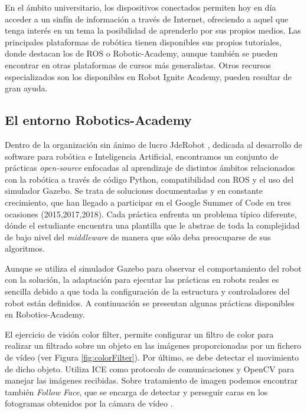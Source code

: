 \documentclass[12pt,spanish,chapterprefix, numbers=noenddot]{book}
\numberwithin{equation}{section}
\numberwithin{figure}{section}
\begin{document}
En el ámbito universitario, los dispositivos conectados permiten hoy en día acceder a un sinfín de información a través de Internet, ofreciendo a aquel que tenga interés en un tema la posibilidad de aprenderlo por sus propios medios. 
Las principales plataformas de robótica tienen disponibles sus propios tutoriales, donde destacan los de ROS o Robotic-Academy, aunque también se pueden encontrar en otras plataformas de cursos más generalistas. Otros recursos especializados son los disponibles en Robot Ignite Academy, pueden resultar de gran ayuda. 

\subsection{El entorno Robotics-Academy}
Dentro de la organización sin ánimo de lucro JdeRobot \cite{jderobot}, dedicada al desarrollo de software para robótica e Inteligencia Artificial, encontramos un conjunto de prácticas \textit{open-source} enfocadas al aprendizaje de distintos ámbitos relacionados con la robótica a través de código Python, compatibilidad con ROS y el uso del simulador Gazebo. Se trata de soluciones documentadas y en constante crecimiento, que han llegado a participar en el Google Summer of Code en tres ocasiones (2015,2017,2018).
Cada práctica enfrenta un problema típico diferente, dónde el estudiante encuentra una plantilla que le abstrae de toda la complejidad de bajo nivel del \textit{middleware} de manera que sólo deba preocuparse de sus algoritmos. 

Aunque se utiliza el simulador Gazebo para observar el comportamiento del robot con la solución, la adaptación para ejecutar las prácticas en robots reales es sencilla debido a que toda la configuración de la estructura y controladores del robot están definidos. A continuación se presentan algunas prácticas disponibles en Robotics-Academy.

El ejercicio de visión color filter, permite configurar un filtro  de color para realizar un filtrado sobre un objeto en las imágenes proporcionadas por un fichero de vídeo (ver Figura \ref{fig:colorFilter}). Por último, se debe detectar el movimiento de dicho objeto. Utiliza ICE como protocolo de comunicaciones y OpenCV para manejar las imágenes recibidas. 
Sobre tratamiento de imagen podemos encontrar también \textit{Follow Face}, que se encarga de detectar y perseguir caras en los fotogramas obtenidos por la cámara de vídeo \cite{Carlos}. 
\end{document}
